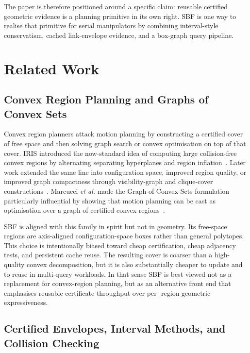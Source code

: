 \documentclass[journal]{IEEEtran}
\newcommand{\etal}{\textit{et al.}}
\begin{document}
The paper is therefore positioned around a specific claim: reusable certified
geometric evidence is a planning primitive in its own right. SBF is one way to
realise that primitive for serial manipulators by combining interval-style
conservatism, cached link-envelope evidence, and a box-graph query pipeline.

\section{Related Work}\label{sec:related}

\subsection{Convex Region Planning and Graphs of Convex Sets}

Convex region planners attack motion planning by constructing a certified cover
of free space and then solving graph search or convex optimisation on top of
that cover. IRIS introduced the now-standard idea of computing large
collision-free convex regions by alternating separating hyperplanes and region
inflation~\cite{deits2015computing}. Later work extended the same line into
configuration space, improved region quality, or improved graph compactness
through visibility-graph and clique-cover constructions~\cite{amice2022finding,
petersen2023growing,werner2024approximating}. Marcucci \etal{} made the
Graph-of-Convex-Sets formulation particularly influential by showing that motion
planning can be cast as optimisation over a graph of certified convex
regions~\cite{marcucci2023motion,marcucci2024shortest}.

SBF is aligned with this family in spirit but not in geometry. Its free-space
regions are axis-aligned configuration-space boxes rather than general
polytopes. This choice is intentionally biased toward cheap certification,
cheap adjacency tests, and persistent cache reuse. The resulting cover is
coarser than a high-quality convex decomposition, but it is also substantially
cheaper to update and to reuse in multi-query workloads. In that sense SBF is
best viewed not as a replacement for convex-region planning, but as an
alternative front end that emphasises reusable certificate throughput over per-
region geometric expressiveness.

\subsection{Certified Envelopes, Interval Methods, and Collision Checking}
\end{document}
